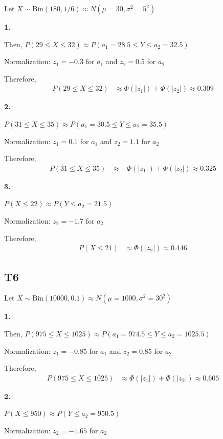 \documentclass[12pt, a4paper]{article}
\begin{document}
Let $X \sim \text{Bin}(180, 1/6) \approx N(\mu = 30, \sigma^2 = 5^2)$

\textbf{1.}

Then, $P(29 \leq X \leq 32) \approx P(a_1 = 28.5 \leq Y \leq a_2 = 32.5)$

Normalization: $z_1 = -0.3$ for $a_1$ and $z_2 = 0.5$ for $a_2$

Therefore,
\begin{align*}
P(29 \leq X \leq 32) &\approx \Phi(|z_1|) + \Phi(|z_2|) \approx 0.309
\end{align*}

\textbf{2.}

$P(31 \leq X \leq 35) \approx P(a_1 = 30.5 \leq Y \leq a_2 = 35.5)$

Normalization: $z_1 = 0.1$ for $a_1$ and $z_2 = 1.1$ for $a_2$

Therefore,
\begin{align*}
P(31 \leq X \leq 35) &\approx -\Phi(|z_1|) + \Phi(|z_2|) \approx 0.325
\end{align*}

\textbf{3.}

$P(X \leq 22) \approx P(Y \leq a_2 = 21.5)$

Normalization: $z_2 = -1.7$ for $a_2$

Therefore,
\begin{align*}
P(X \leq 21) &\approx \Phi(|z_2|) \approx 0.446
\end{align*}

\subsection*{T6}

Let $X \sim \text{Bin}(10000, 0.1) \approx N(\mu = 1000, \sigma^2 = 30^2)$

\textbf{1.}

Then, $P(975 \leq X \leq 1025) \approx P(a_1 = 974.5 \leq Y \leq a_2 = 1025.5)$

Normalization: $z_1 = -0.85$ for $a_1$ and $z_2 = 0.85$ for $a_2$

Therefore,
\begin{align*}
P(975 \leq X \leq 1025) &\approx \Phi(|z_1|) + \Phi(|z_2|) \approx 0.605
\end{align*}

\textbf{2.}

$P(X \leq 950) \approx P(Y \leq a_2 = 950.5)$

Normalization: $z_2 = -1.65$ for $a_2$
\end{document}
